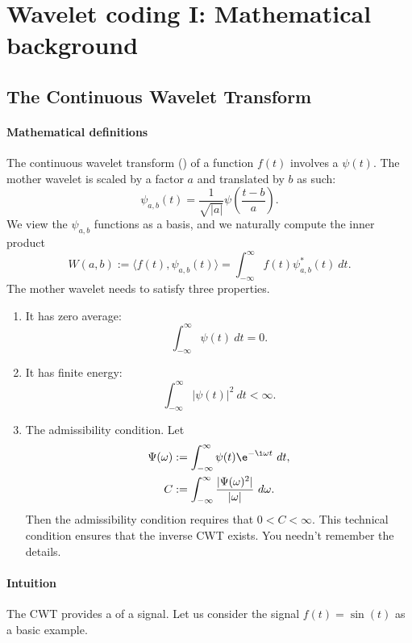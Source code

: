 


\section{Wavelet coding I: Mathematical background}
\label{sec:08}


\subsection{The Continuous Wavelet Transform}

\paragraph{Mathematical definitions} 
The continuous wavelet transform () of a function $f(t)$ involves a  $\psi(t)$. The mother wavelet is scaled by a factor $a$ and translated by $b$ as such:
\[
    \psi_{a,b}(t) = \frac{1}{\sqrt{|a|}} \psi \left( \frac{t-b}{a} \right).
\]
We view the $\psi_{a,b}$ functions as a basis, and we naturally compute the inner product
\[
    W(a,b) := \langle f(t), \psi_{a,b}(t)  \rangle = \int_{-\infty}^\infty f(t) \psi^*_{a,b}(t) \ dt.
\]
The mother wavelet needs to satisfy three properties.
\begin{enumerate}
    \item It has zero average:
    \[
        \int_{-\infty}^\infty \psi(t) \ dt = 0.
    \]
    
    \item It has finite energy:
    \[
        \int_{-\infty}^\infty |\psi(t)|^2 \ dt < \infty. 
    \]
    
    \item The admissibility condition. Let
    \begin{align*}
        \Psi(\omega) &:= \int_{-\infty}^\infty \psi(t) \e^{-\i \omega t} \ dt,\\
        C &:= \int_{-\infty}^\infty \frac{ |\Psi(\omega)^2| }{ |\omega| } \ d\omega.
    \end{align*}
    Then the admissibility condition requires that $0 < C < \infty$. This technical condition ensures that the inverse CWT exists. You needn't remember the details.
\end{enumerate}

\paragraph{Intuition}
The CWT provides a  of a signal. Let us consider the signal $f(t) = \sin (t)$ as a basic example. 

